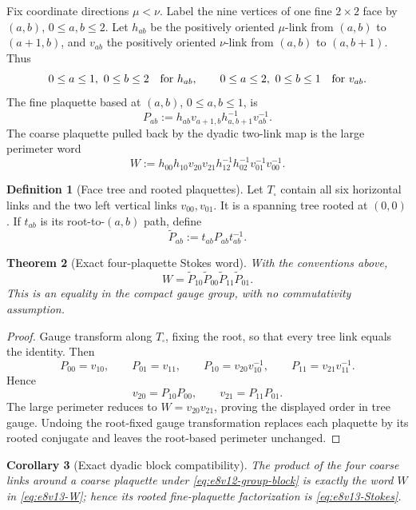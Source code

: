 \documentclass[11pt,oneside]{book}
\newtheorem{theorem}{Theorem}[chapter]
\newtheorem{corollary}[theorem]{Corollary}
\theoremstyle{definition}
\newtheorem{definition}[theorem]{Definition}
\theoremstyle{remark}
\begin{document}
Fix coordinate directions \(\mu<\nu\).  Label the nine vertices of
one fine \(2\times2\) face by \((a,b)\), \(0\le a,b\le2\).
Let \(h_{ab}\) be the positively oriented \(\mu\)-link from
\((a,b)\) to \((a+1,b)\), and \(v_{ab}\) the positively oriented
\(\nu\)-link from \((a,b)\) to \((a,b+1)\).  Thus
\[
 0\le a\le1,\ 0\le b\le2\quad\hbox{for }h_{ab},
 \qquad
 0\le a\le2,\ 0\le b\le1\quad\hbox{for }v_{ab}.      \label{eq:e8v13-links}
\]
The fine plaquette based at \((a,b)\), \(0\le a,b\le1\), is
\[
 P_{ab}:=h_{ab}v_{a+1,b}h_{a,b+1}^{-1}v_{ab}^{-1}. \label{eq:e8v13-Pab}
\]
The coarse plaquette pulled back by the dyadic two-link map is the
large perimeter word
\[
 W:=
 h_{00}h_{10}v_{20}v_{21}
 h_{12}^{-1}h_{02}^{-1}v_{01}^{-1}v_{00}^{-1}.      \label{eq:e8v13-W}
\]

\begin{definition}[Face tree and rooted plaquettes]
\label{def:e8v13-tree}
Let \(T_\square\) contain all six horizontal links and the two left
vertical links \(v_{00},v_{01}\).  It is a spanning tree rooted at
\((0,0)\).  If \(t_{ab}\) is its root-to-\((a,b)\) path, define
\[
 \widetilde P_{ab}:=t_{ab}P_{ab}t_{ab}^{-1}.        \label{eq:e8v13-rooted-P}
\]
\end{definition}

\begin{theorem}[Exact four-plaquette Stokes word]
\label{thm:e8v13-Stokes}
With the conventions above,
\[
 \boxed{
 W=\widetilde P_{10}\widetilde P_{00}
   \widetilde P_{11}\widetilde P_{01}.}             \label{eq:e8v13-Stokes}
\]
This is an equality in the compact gauge group, with no commutativity
assumption.
\end{theorem}

\begin{proof}
Gauge transform along \(T_\square\), fixing the root, so that every
tree link equals the identity.  Then
\[
 P_{00}=v_{10},\qquad P_{01}=v_{11},\qquad
 P_{10}=v_{20}v_{10}^{-1},\qquad
 P_{11}=v_{21}v_{11}^{-1}.                          \label{eq:e8v13-tree-gauge-P}
\]
Hence
\[
 v_{20}=P_{10}P_{00},\qquad
 v_{21}=P_{11}P_{01}.
\]
The large perimeter reduces to \(W=v_{20}v_{21}\), proving the
displayed order in tree gauge.  Undoing the root-fixed gauge
transformation replaces each plaquette by its rooted conjugate and
leaves the root-based perimeter unchanged.
\end{proof}

\begin{corollary}[Exact dyadic block compatibility]
\label{cor:e8v13-block}
The product of the four coarse links around a coarse plaquette under
\eqref{eq:e8v12-group-block} is exactly the word \(W\) in
\eqref{eq:e8v13-W}; hence its rooted fine-plaquette factorization is
\eqref{eq:e8v13-Stokes}.
\end{corollary}
\end{document}
